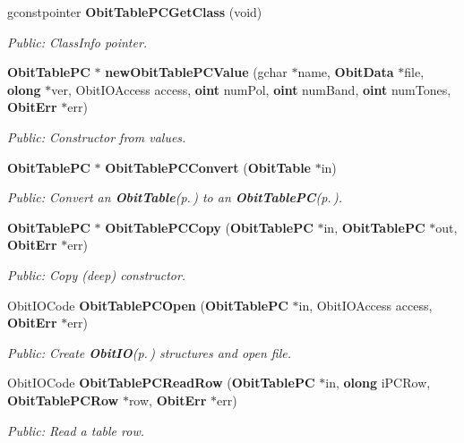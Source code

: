 \begin{CompactItemize}
gconstpointer {\bf Obit\-Table\-PCGet\-Class} (void)
\begin{CompactList}\small\item\em Public: Class\-Info pointer. \item\end{CompactList}\item 
{\bf Obit\-Table\-PC} $\ast$ {\bf new\-Obit\-Table\-PCValue} (gchar $\ast$name, {\bf Obit\-Data} $\ast$file, {\bf olong} $\ast$ver, Obit\-IOAccess access, {\bf oint} num\-Pol, {\bf oint} num\-Band, {\bf oint} num\-Tones, {\bf Obit\-Err} $\ast$err)
\begin{CompactList}\small\item\em Public: Constructor from values. \item\end{CompactList}\item 
{\bf Obit\-Table\-PC} $\ast$ {\bf Obit\-Table\-PCConvert} ({\bf Obit\-Table} $\ast$in)
\begin{CompactList}\small\item\em Public: Convert an {\bf Obit\-Table}{\rm (p.\,\pageref{structObitTable})} to an {\bf Obit\-Table\-PC}{\rm (p.\,\pageref{structObitTablePC})}. \item\end{CompactList}\item 
{\bf Obit\-Table\-PC} $\ast$ {\bf Obit\-Table\-PCCopy} ({\bf Obit\-Table\-PC} $\ast$in, {\bf Obit\-Table\-PC} $\ast$out, {\bf Obit\-Err} $\ast$err)
\begin{CompactList}\small\item\em Public: Copy (deep) constructor. \item\end{CompactList}\item 
Obit\-IOCode {\bf Obit\-Table\-PCOpen} ({\bf Obit\-Table\-PC} $\ast$in, Obit\-IOAccess access, {\bf Obit\-Err} $\ast$err)
\begin{CompactList}\small\item\em Public: Create {\bf Obit\-IO}{\rm (p.\,\pageref{structObitIO})} structures and open file. \item\end{CompactList}\item 
Obit\-IOCode {\bf Obit\-Table\-PCRead\-Row} ({\bf Obit\-Table\-PC} $\ast$in, {\bf olong} i\-PCRow, {\bf Obit\-Table\-PCRow} $\ast$row, {\bf Obit\-Err} $\ast$err)
\begin{CompactList}\small\item\em Public: Read a table row. \item\end{CompactList}\item 

\end{CompactItemize}
